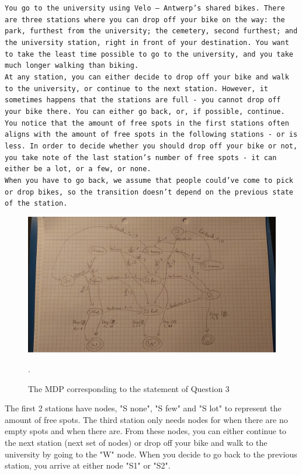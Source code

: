 \documentclass[a4paper]{article}
\begin{document}
\texttt{You go to the university using Velo -- Antwerp's shared bikes. There are three stations where you can drop off your bike on the way: the park, furthest from the university; the cemetery, second furthest; and the university station, right in front of your destination.
You want to take the least time possible to go to the university, and you take much longer walking than biking. \\
At any station, you can either decide to drop off your bike and walk to the university, or continue to the next station.
However, it sometimes happens that the stations are full - you cannot drop off your bike there. You can either go back, or, if possible, continue.\\
You notice that the amount of free spots in the first stations often aligns with the amount of free spots in the following stations - or is less. In order to decide whether you should drop off your bike or not, you take note of the last station's number of free spots - it can either be a lot, or a few, or none.\\
When you have to go back, we assume that people could've come to pick or drop bikes, so the transition doesn't depend on the previous state of the station.
}

\begin{figure}[H]
    \centering
    \includegraphics[width=16cm]{plots/Velo_MDP.png}
    \caption{The MDP corresponding to the statement of Question 3}.
    \label{fig:q3}
\end{figure}{}
The first 2 stations have nodes, "S none", "S few" and "S lot" to represent the amount of free spots. The third station only needs nodes for when there are no empty spots and when there are.
From these nodes, you can either continue to the next station (next set of nodes) or drop off your bike and walk to the university by going to the "W" node.
When you decide to go back to the previous station, you arrive at either node "S1" or "S2".
\end{document}
